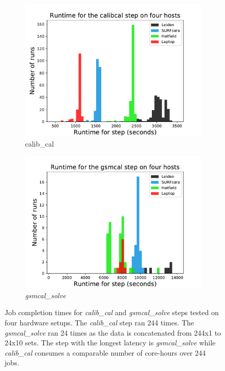 
\begin{figure}
  \centering
   \begin{subfigure}{.45\linewidth}
    \includegraphics[width=\textwidth]{ch4/figures/fig3/figure3_calibcal.pdf}
    \caption{calib\_cal}
	\label{calib_cal_bar}
 \end{subfigure}%
 \begin{subfigure}{.45\linewidth}
  \includegraphics[width=\textwidth]{ch4/figures/fig3/figure3_gsmcal.pdf}
  \caption{\textit{gsmcal\_solve} }
  \label{gsmcal_bar}
 \end{subfigure}
  \caption{Job completion times for \textit{calib\_cal} and \textit{gsmcal\_solve} steps tested on four hardware setups. The \textit{calib\_cal} step ran 244 times. The \textit{gsmcal\_solve} ran 24 times as the data is concatenated from 244x1 to 24x10 sets.  The step with the longest latency is \textit{gsmcal\_solve} while \textit{calib\_cal} consumes a comparable number of core-hours over 244 jobs. } 
  \label{calibcal_fitclock_bars}
\end{figure}

